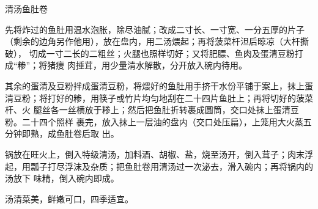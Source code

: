 %
%
%
%
%
%
%
\begin{recipe}{清汤鱼肚卷}

\ingredients


\preparation

\step 先将炸过的鱼肚用温水泡胀，除尽油腻；改成二寸长、一寸宽、一分五厚的片子
（剩余的边角另作他用），放在盘内，用二汤煨起；再将菠菜杆泹后晾凉（大杆撕破），
切成一寸二长的二粗丝；火腿也照样切好；又将肥膘、鱼肉及蛋清豆粉打成“糁”；将猪痩
肉捶茸，用少量清水解散，分开放入碗内待用。

\step 其余的蛋清及豆粉拌成蛋清豆粉，将煨好的鱼肚用手挤干水份平铺于案上，抹上蛋
清豆粉；将打好的糁，用筷子或竹片均匀地刮在二十四片鱼肚上；再将切好的菠菜杆、火
腿丝各一丝横放于糁上；然后把鱼肚折转裹成圆筒，交口处抹上蛋清豆粉。二十四个照样
裹完，放入抹上一层油的盘内（交口处压扁），上笼用大火蒸五分钟即熟，成鱼肚卷后取
出。

\step 锅放在旺火上，倒入特级清汤，加料酒、胡椒、盐，烧至汤开，倒入茸子；肉末浮
起，用瓢子打尽浮沫及杂质；把鱼肚卷用清汤过一次泌去，滑入碗内；再将锅内的汤放下
味精，倒入碗内即成。

\features

汤清菜美，鲜嫩可口，四季适宜。

\end{recipe}

